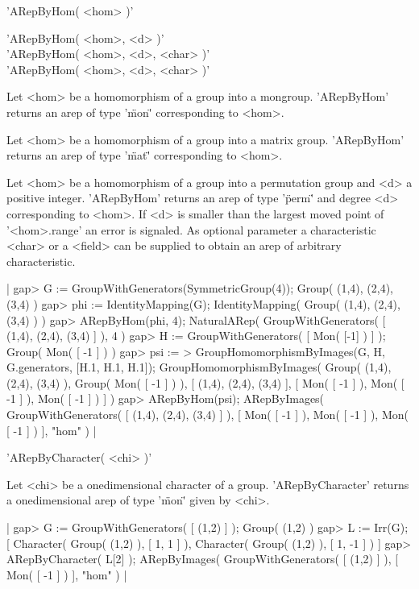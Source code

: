 
'ARepByHom( <hom> )'

\medskip
'ARepByHom( <hom>, <d> )'\\
'ARepByHom( <hom>, <d>, <char> )'\\
'ARepByHom( <hom>, <d>, <char> )'

Let <hom> be a homomorphism of a group into a mongroup. 
'ARepByHom' returns an arep of type '\"mon\"' corresponding
to <hom>.

Let <hom> be a homomorphism of a group into a matrix group. 
'ARepByHom' returns an arep of type '\"mat\"' corresponding
to <hom>.

Let <hom> be a homomorphism of a group into a permutation group 
and <d> a positive integer.
'ARepByHom' returns an arep of type '\"perm\"' and degree <d> 
corresponding to <hom>. If <d> is smaller than the largest moved
point of '<hom>.range' an error is signaled. As optional parameter 
a characteristic <char> or a <field> can be supplied to obtain an 
arep of arbitrary characteristic.

|    gap> G := GroupWithGenerators(SymmetricGroup(4));
    Group( (1,4), (2,4), (3,4) )
    gap> phi := IdentityMapping(G);
    IdentityMapping( Group( (1,4), (2,4), (3,4) ) )
    gap> ARepByHom(phi, 4);
    NaturalARep( GroupWithGenerators( [ (1,4), (2,4), (3,4) ] ), 4 )
    gap> H := GroupWithGenerators( [ Mon( [-1] ) ] );
    Group( Mon( [ -1 ] ) )
    gap> psi := 
    > GroupHomomorphismByImages(G, H, G.generators, [H.1, H.1, H.1]);
    GroupHomomorphismByImages( 
      Group( (1,4), (2,4), (3,4) ), 
      Group( Mon( [ -1 ] ) ), 
      [ (1,4), (2,4), (3,4) ], 
      [ Mon( [ -1 ] ), Mon( [ -1 ] ), Mon( [ -1 ] ) ] )
    gap> ARepByHom(psi);
    ARepByImages(
      GroupWithGenerators( [ (1,4), (2,4), (3,4) ] ),
      [ Mon( [ -1 ] ),
        Mon( [ -1 ] ),
        Mon( [ -1 ] )
      ],
      "hom"
    ) |


'ARepByCharacter( <chi> )'

Let <chi> be a onedimensional character of a group. 
'ARepByCharacter' returns a onedimensional arep of 
type '\"mon\"' given by <chi>.

|    gap> G := GroupWithGenerators( [ (1,2) ] );
    Group( (1,2) )
    gap> L := Irr(G);
    [ Character( Group( (1,2) ), [ 1, 1 ] ), 
      Character( Group( (1,2) ), [ 1, -1 ] ) ]
    gap> ARepByCharacter( L[2] );
    ARepByImages(
      GroupWithGenerators( [ (1,2) ] ),
      [ Mon( [ -1 ] ) ],
      "hom"
    ) |

